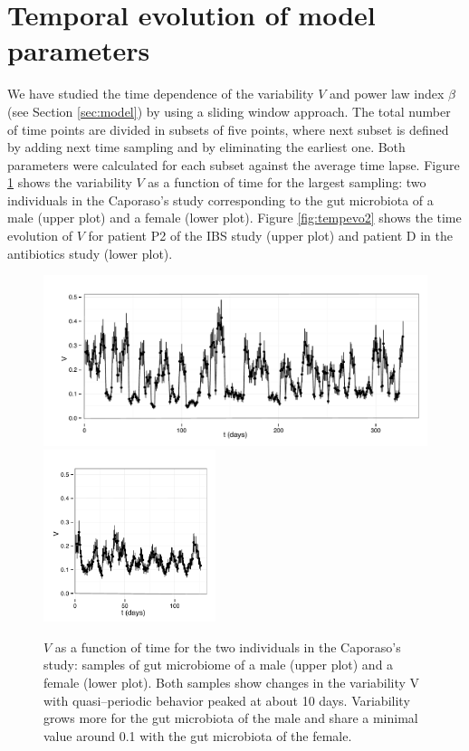 \documentclass[12pt,oneside,letterpaper]{article}
\begin{document}
\section{Temporal evolution of model parameters}

We have studied the time dependence of the variability $V$ and power law index $\beta$ (see Section \ref{sec:model}) by using a sliding window approach. The total number of time points are divided in subsets of five points, where next subset is defined by adding next time sampling and by eliminating the earliest one. Both parameters were calculated for each subset against the average time lapse. Figure \ref{fig:tempevo1} shows the variability  $V$ as a function of time for the largest sampling: two individuals in the Caporaso's study\cite{moving} corresponding to the gut microbiota of a male (upper plot) and a female (lower plot). Figure \ref{fig:tempevo2} shows the time evolution of $V$ for patient P2 of the IBS study\cite{IBS} (upper plot) and patient D in the antibiotics study\cite{antibiotic} (lower plot). 

\begin{figure}
	\includegraphics[width=1.0\textwidth]{results/sliwin/male_mov.pdf}
	\hspace*{3mm}\includegraphics[width=0.448\textwidth]{results/sliwin/female_mov.pdf}
\caption{$V$ as a function of time for the two individuals in the Caporaso's study\cite{moving}: samples of gut microbiome of a male (upper plot) and a female (lower plot). Both samples show changes in the variability V with quasi--periodic behavior peaked at about 10 days. Variability grows more for the gut microbiota of the male and share a minimal value around 0.1 with the gut microbiota of the female.}
\label{fig:tempevo1}
\end{figure}
\end{document}
